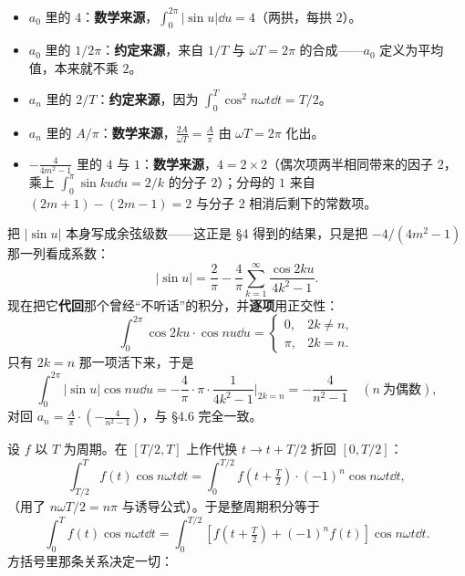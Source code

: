 \documentclass[11pt]{ctexart}
\begin{document}
\begin{itemize}
\item $a_0$ 里的 $4$：\textbf{数学来源}，$\int_0^{2\pi}|\sin u|\dd u=4$（两拱，每拱 $2$）。
\item $a_0$ 里的 $1/2\pi$：\textbf{约定来源}，来自 $1/T$ 与 $\omega T=2\pi$ 的合成——$a_0$ 定义为平均值，本来就不乘 $2$。
\item $a_n$ 里的 $2/T$：\textbf{约定来源}，因为 $\int_0^T\cos^2 n\omega t\dd t=T/2$。
\item $a_n$ 里的 $A/\pi$：\textbf{数学来源}，$\frac{2A}{\omega T}=\frac{A}{\pi}$ 由 $\omega T=2\pi$ 化出。
\item $-\frac{4}{4m^2-1}$ 里的 $4$ 与 $1$：\textbf{数学来源}，$4=2\times2$（偶次项两半相同带来的因子 $2$，乘上 $\int_0^\pi\sin ku\dd u=2/k$ 的分子 $2$）；分母的 $1$ 来自 $(2m+1)-(2m-1)=2$ 与分子 $2$ 相消后剩下的常数项。
\end{itemize}


把 $|\sin u|$ 本身写成余弦级数——这正是 §4 得到的结果，只是把 $-4/(4m^2-1)$ 那一列看成系数：
\[
\left|\sin u\right|=\frac{2}{\pi}-\frac{4}{\pi}\sum_{k=1}^{\infty}\frac{\cos 2ku}{4k^2-1} .
\]
现在把它\textbf{代回}那个曾经“不听话”的积分，并\textbf{逐项}用正交性：
\[
\int_0^{2\pi}\cos 2ku\cdot\cos nu\dd u
=\begin{cases}0, & 2k\neq n,\\ \pi, & 2k=n .\end{cases}
\]
只有 $2k=n$ 那一项活下来，于是
\[
\int_0^{2\pi}\left|\sin u\right|\cos nu\dd u
=-\frac{4}{\pi}\cdot\pi\cdot\frac{1}{4k^2-1}\Bigg|_{2k=n}
=-\frac{4}{n^2-1}\quad(n\ \text{为偶数}),
\]
对回 $a_n=\frac{A}{\pi}\cdot\left(-\frac{4}{n^2-1}\right)$，与 §4.6 完全一致。




设 $f$ 以 $T$ 为周期。在 $\left[T/2,T\right]$ 上作代换 $t\to t+T/2$ 折回 $\left[0,T/2\right]$：
\[
\int_{T/2}^{T}f(t)\cos n\omega t\dd t
=\int_0^{T/2}f\left(t+\tfrac{T}{2}\right)\cdot(-1)^n\cos n\omega t\dd t ,
\]
（用了 $n\omega T/2=n\pi$ 与诱导公式）。于是整周期积分等于
\[
\int_0^{T}f(t)\cos n\omega t\dd t
=\int_0^{T/2}\left[f\left(t+\tfrac{T}{2}\right)+(-1)^n f(t)\right]\cos n\omega t\dd t .
\]
方括号里那条关系决定一切：
\end{document}
